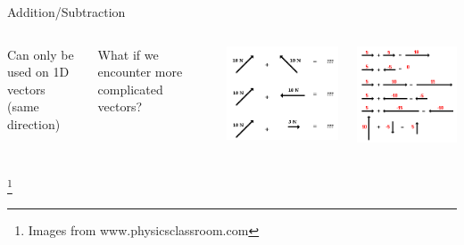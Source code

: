 \documentclass[aspectratio=169]{beamer}
\newcommand\blfootnote[1]{%
	\begingroup
	\renewcommand\thefootnote{}\footnote{#1}%
	\addtocounter{footnote}{-1}%
	\endgroup
}
\begin{document}
\begin{frame}{Addition/Subtraction}
	\begin{columns}
		Can only be used on 1D vectors \\ (same direction)\\~\\
		\uncover<2-> {What if we encounter more complicated vectors?\\
		\begin{center}
			\includegraphics[scale=0.4]{compvec.png}
		\end{center}}
		\includegraphics[scale=0.5]{vectoradd.png}
	\end{columns}
	\blfootnote{Images from www.physicsclassroom.com}
\end{frame}
\end{document}
